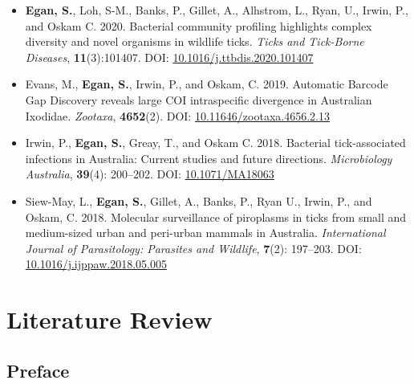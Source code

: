 \documentclass[a4paper, nobind]{templates/ociamthesis}
\renewcommand{\chaptermark}[1]{\markboth{\thechapter. #1}{\thechapter. #1}}
\begin{document}
\begin{itemize}
\item
  \textbf{Egan, S.}, Loh, S-M., Banks, P., Gillet, A., Alhstrom, L., Ryan, U., Irwin, P., and Oskam C. 2020. Bacterial community profiling highlights complex diversity and novel organisms in wildlife ticks. \emph{Ticks and Tick-Borne Diseases}, \textbf{11}(3):101407. DOI: \href{https://doi.org/10.1016/j.ttbdis.2020.101407}{10.1016/j.ttbdis.2020.101407}
\item
  Evans, M., \textbf{Egan, S.}, Irwin, P., and Oskam, C. 2019. Automatic Barcode Gap Discovery reveals large COI intraspecific divergence in Australian Ixodidae. \emph{Zootaxa}, \textbf{4652}(2). DOI: \href{https://doi.org/10.11646/zootaxa.4656.2.13}{10.11646/zootaxa.4656.2.13}
\item
  Irwin, P., \textbf{Egan, S.}, Greay, T., and Oskam C. 2018. Bacterial tick-associated infections in Australia: Current studies and future directions. \emph{Microbiology Australia}, \textbf{39}(4): 200--202. DOI: \href{https://doi.org/10.1071/MA18063}{10.1071/MA18063}
\item
  Siew-May, L., \textbf{Egan, S.}, Gillet, A., Banks, P., Ryan U., Irwin, P., and Oskam, C. 2018. Molecular surveillance of piroplasms in ticks from small and medium-sized urban and peri-urban mammals in Australia. \emph{International Journal of Parasitology: Parasites and Wildlife}, \textbf{7}(2): 197--203. DOI: \href{https://doi.org/10.1016/j.ijppaw.2018.05.005}{10.1016/j.ijppaw.2018.05.005}
\end{itemize}

\hypertarget{litrev}{%
\chapter{Literature Review}\label{litrev}}

\chaptermark{Review}

\minitoc 

\hypertarget{preface}{%
\section*{Preface}\label{preface}}

\nocite{guglielmoneIxodidaeAcariIxodoidea2020}
\nocite{lohIdentificationTheileriaFuliginosalike2018}
\nocite{cooperDetectionCoxiellaBurnetii2013} \nocite{greayIlluminatingBacterialMicrobiome2021} \nocite{brodyCaseTickTyphus1946} \nocite{popeIsolationRickettsiaResembling1955} \nocite{owenDetectionIdentificationNovel2006} \nocite{owenPotentiallyPathogenicSpotted2006} \nocite{sentausaGenomeSequenceRickettsia2013} \nocite{liHighPrevalenceRickettsia2010} \nocite{abdadRickettsiaGravesiiSp2017} \nocite{owenDetectionCharacterisationRickettsiae2007} \nocite{bennettCoxiellaBurnetiiWestern2011}
\nocite{jefferiesTwoSpeciesCanine2003}
\nocite{jonssonProductivityHealthEffects2008}
\nocite{angusHistoryCattleTick1996}
\end{document}

